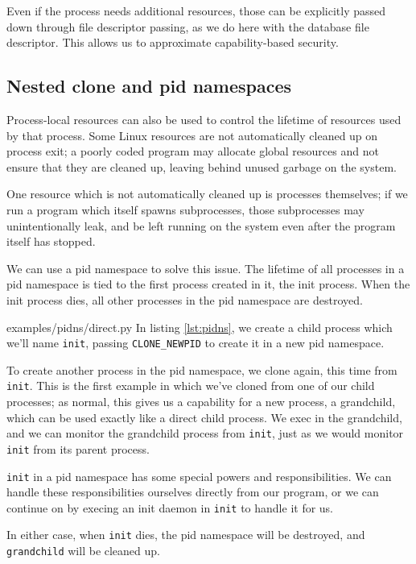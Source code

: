 \documentclass[letterpaper,twocolumn,10pt]{article}
\begin{document}
Even if the process needs additional resources,
those can be explicitly passed down through file descriptor passing,
as we do here with the database file descriptor.
This allows us to approximate capability-based security.\cite{capsicum}
\subsection{Nested clone and pid namespaces}\label{pidns}
Process-local resources can also be used to control the lifetime of resources used by that process.
Some Linux resources are not automatically cleaned up on process exit;
a poorly coded program may allocate global resources
and not ensure that they are cleaned up,
leaving behind unused garbage on the system.

One resource which is not automatically cleaned up is processes themselves;
if we run a program which itself spawns subprocesses,
those subprocesses may unintentionally leak,
and be left running on the system even after the program itself has stopped.\cite{caternfork}

We can use a pid namespace to solve this issue.
The lifetime of all processes in a pid namespace is tied to the first process created in it,
the init process.
When the init process dies,
all other processes in the pid namespace are destroyed.\cite{pid_namespaces}


{examples/pidns/direct.py}
In listing \ref{lst:pidns},
we create a child process which we'll name \texttt{init},
passing \verb|CLONE_NEWPID| to create it in a new pid namespace.\cite{clone}

To create another process in the pid namespace,
we clone again, this time from \texttt{init}.
This is the first example in which we've cloned from one of our child processes;
as normal, this gives us a capability for a new process, a grandchild,
which can be used exactly like a direct child process.
We exec in the grandchild,
and we can monitor the grandchild process from \texttt{init},
just as we would monitor \texttt{init} from its parent process.

\texttt{init} in a pid namespace has some special powers and responsibilities.
We can handle these responsibilities ourselves directly from our program,
or we can continue on by execing an init daemon in \texttt{init} to handle it for us.
\cite{pid_namespaces}\cite{tini}\cite{dumb_init}

In either case, when \texttt{init} dies,
the pid namespace will be destroyed,
and \texttt{grandchild} will be cleaned up.
\end{document}

